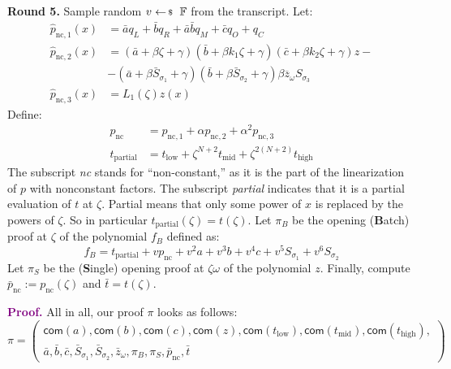 \documentclass[../lecture-notes-148x210.tex]{subfiles}
\begin{document}
\textcolor{green!60!black}{\textbf{Round 5.}} Sample random $v \leftarrowS
\mathbb{F}$ from the transcript. Let:
\begin{equation*}    
    \begin{aligned}
        \hat{p}_{\text{nc},1}(x) &= \bar{a}q_L + \bar{b}q_R + \bar{a}\bar{b}q_M + \bar{c}q_O + q_C \\
        \hat{p}_{\text{nc},2}(x) &= (\bar{a} + \beta \zeta + \gamma)(\bar{b} + \beta k_1 \zeta + \gamma)(\bar{c} + \beta k_2 \zeta + \gamma) z - \\
                                 &- (\bar{a} + \beta \bar{S}_{\sigma_1} + \gamma)(\bar{b} + \beta \bar{S}_{\sigma_2} + \gamma)\beta \overline{z}_{\omega}S_{\sigma_3} \\
        \hat{p}_{\text{nc},3}(x) &= L_1(\zeta)z(x)
    \end{aligned}
\end{equation*}
Define:
\begin{align*}
p_{\text{nc}} &= p_{\text{nc},1} + \alpha p_{\text{nc}, 2} + \alpha^2 p_{\text{nc}, 3} \\
t_{\text{partial}} &= t_{\text{low}} + \zeta^{N+2}t_{\text{mid}} + \zeta^{2(N+2)}t_{\text{high}}
\end{align*}
The subscript \emph{nc} stands for ``non-constant,'' as it is the part of the
linearization of $p$ with nonconstant factors. The subscript \emph{partial} indicates
that it is a partial evaluation of $t$ at $\zeta$. Partial means that only some
power of $x$ is replaced by the powers of $\zeta$. So in particular
$t_{\text{partial}}(\zeta) = t(\zeta)$. Let $\pi_B$ be the opening (\textbf{B}atch) proof at
$\zeta$ of the polynomial $f_B$ defined as: 
\[
f_B = t_{\text{partial}} + v p_{\text{nc}} + v^2 a + v^3 b + v^4 c + v^5 S_{\sigma_1} + v^6 S_{\sigma_2}
\]
Let $\pi_{S}$ be the (\textbf{S}ingle) opening proof at $\zeta\omega$ of the polynomial
$z$. Finally, compute $\bar{p}_{\text{nc}} := p_{\text{nc}}(\zeta)$ and $\bar{t} = t(\zeta)$.

\textcolor{purple}{\textbf{Proof.}} All in all, our proof $\pi$ looks as follows:
\begin{equation*}
    \pi = \begin{pmatrix}\mathsf{com}(a), \mathsf{com}(b), \mathsf{com}(c), \mathsf{com}(z), \mathsf{com}(t_{\text{low}}), \mathsf{com}(t_{\text{mid}}), \mathsf{com}(t_{\text{high}}), \\
        \bar{a}, \bar{b}, \bar{c}, \bar{S}_{\sigma_1}, \bar{S}_{\sigma_2}, \bar{z}_{\omega}, \pi_{B}, \pi_{S}, \bar{p}_{\text{nc}}, \bar{t}
    \end{pmatrix}
\end{equation*}
\end{document}
